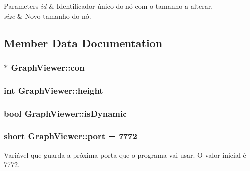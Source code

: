 \begin{DoxyParams}{Parameters}
{\em id} & Identificador único do nó com o tamanho a alterar. \\
\hline
{\em size} & Novo tamanho do nó. \\
\hline
\end{DoxyParams}


\subsection{Member Data Documentation}
\subsubsection[{\texorpdfstring{con}{con}}]{$\ast$ Graph\+Viewer\+::con\hspace{0.3cm}{\ttfamily [private]}}\hypertarget{classGraphViewer_a14a206f78c242e739e0908b06070ba4d}{}\label{classGraphViewer_a14a206f78c242e739e0908b06070ba4d}
\subsubsection[{\texorpdfstring{height}{height}}]{\setlength{\rightskip}{0pt plus 5cm}int Graph\+Viewer\+::height\hspace{0.3cm}{\ttfamily [private]}}\hypertarget{classGraphViewer_a9a1000e492a66ac4301c7135275690da}{}\label{classGraphViewer_a9a1000e492a66ac4301c7135275690da}
\subsubsection[{\texorpdfstring{is\+Dynamic}{isDynamic}}]{\setlength{\rightskip}{0pt plus 5cm}bool Graph\+Viewer\+::is\+Dynamic\hspace{0.3cm}{\ttfamily [private]}}\hypertarget{classGraphViewer_a9d9947154bc63354c6d02a0680aad952}{}\label{classGraphViewer_a9d9947154bc63354c6d02a0680aad952}
\subsubsection[{\texorpdfstring{port}{port}}]{\setlength{\rightskip}{0pt plus 5cm}short Graph\+Viewer\+::port = 7772\hspace{0.3cm}{\ttfamily [static]}}\hypertarget{classGraphViewer_a89d0abe75f41feededc49497cc514342}{}\label{classGraphViewer_a89d0abe75f41feededc49497cc514342}
Variável que guarda a próxima porta que o programa vai usar. O valor inicial é 7772. 
